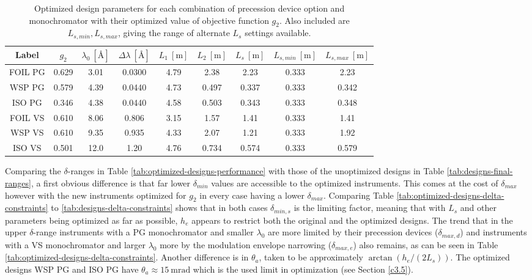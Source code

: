\begin{table}[h!]
	\centering
	\begin{tabular}{c | c | c c c c c | c c}
		\toprule
		Label & $g_2$ & $\lambda_0 ~[\unit{\angstrom}]$ & $\Delta\lambda ~[\unit{\angstrom}]$ & $L_1 ~[\unit{\meter}]$ & $L_2 ~[\unit{\meter}]$ & $L_s  ~[\unit{\meter}]$ & $L_{s,min}  ~[\unit{\meter}]$& $L_{s, max}  ~[\unit{\meter}]$\\
		\midrule
		FOIL PG & \num{0.629} & \num{3.01} & \num{0.0300} & \num{4.79} & \num{2.38} & \num{2.23} & \num{0.333} & \num{2.23} \\
		WSP PG & \num{0.579} & \num{4.39} & \num{0.0440} & \num{4.73} & \num{0.497} & \num{0.337} & \num{0.333} & \num{0.342} \\
		ISO PG & \num{0.346} & \num{4.38} & \num{0.0440} & \num{4.58} & \num{0.503} & \num{0.343} & \num{0.333} & \num{0.348} \\
		FOIL VS & \num{0.610} & \num{8.06} & \num{0.806} & \num{3.15} & \num{1.57} & \num{1.41} & \num{0.333} & \num{1.41} \\
		WSP VS & \num{0.610} & \num{9.35} & \num{0.935} & \num{4.33} & \num{2.07} & \num{1.21} & \num{0.333} & \num{1.92} \\
		ISO VS & \num{0.501} & \num{12.0} & \num{1.20} & \num{4.76} & \num{0.734} & \num{0.574} & \num{0.333} & \num{0.579} \\
		\bottomrule
	\end{tabular}
	\caption{Optimized design parameters for each combination of precession device option and monochromator with their optimized value of objective function $g_2$. Also included are $L_{s,min}, L_{s,max}$, giving the range of alternate $L_s$ settings available.}
	\label{tab:optimized-designs}
\end{table}
Comparing the $\delta$-ranges in Table \ref{tab:optimized-designs-performance} with those of the unoptimized designs in Table \ref{tab:designs-final-ranges}, a first obvious difference is that far lower $\delta_{min}$ values are accessible to the optimized instruments. This comes at the cost of $\delta_{max}$ however with the new instruments optimized for $g_2$ in every case having a lower $\delta_{max}$. Comparing Table \ref{tab:optimized-designs-delta-constraints} to \ref{tab:designs-delta-constraints} shows that in both cases $\delta_{min,s}$ is the limiting factor, meaning that with $L_s$ and other parameters being optimized as far as possible, $h_e$ appears to restrict both the original and the optimized designs. The trend that in the upper $\delta$-range instruments with a PG monochromator and smaller $\lambda_0$ are more limited by their precession devices ($\delta_{max,d}$) and instruments with a VS monochromator and larger $\lambda_0$ more by the modulation envelope narrowing ($\delta_{max,e}$) also remains, as can be seen in Table \ref{tab:optimized-designs-delta-constraints}. Another difference is in $\theta_a$, taken to be approximately $\arctan(h_e/(2L_s))$. The optimized designs WSP PG and ISO PG have $\theta_a \approx \SI{15}{\milli\radian}$ which is the used limit in optimization (see Section \ref{c3.5}).

